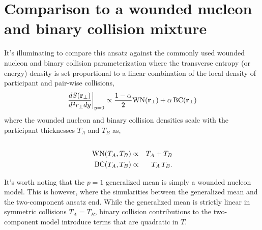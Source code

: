 \documentclass[aps,prl,reprint,amsmath,nofootinbib]{revtex4-1}
\begin{document}
\section{Comparison to a wounded nucleon and binary collision mixture}

It's illuminating to compare this ansatz against the commonly used wounded nucleon and binary collision parameterization where the transverse entropy (or energy) density 
is set proportional to a linear combination of the local density of participant and pair-wise collisions,
\begin{equation}
 \frac{dS({\bf r}_\perp)}{d^2r_\perp dy} \biggr \rvert_{y=0}  \propto \frac{1-\alpha}{2}\mbox{WN}({\bf r_\perp}) + \alpha\, \mbox{BC}({\bf r_\perp}) 
\end{equation}
where the wounded nucleon and binary collision densities scale with the participant thicknesses $T_A$ and $T_B$ as,
\begin{eqnarray}
 \cr \mbox{WN}(T_A,T_B) &\propto& T_A + T_B \\
 \label{binary collisions}
 \mbox{BC}(T_A,T_B) &\propto& T_A\,T_B.
\end{eqnarray}

It's worth noting that the $p=1$ generalized mean is simply a wounded nucleon model. This is however, where the simularities between the generalized
mean and the two-component ansatz end. While the generalized mean is strictly linear in symmetric collisions $T_A=T_B$, binary collision contributions to the 
two-component model introduce terms that are quadratic in $T$.


\end{document}
